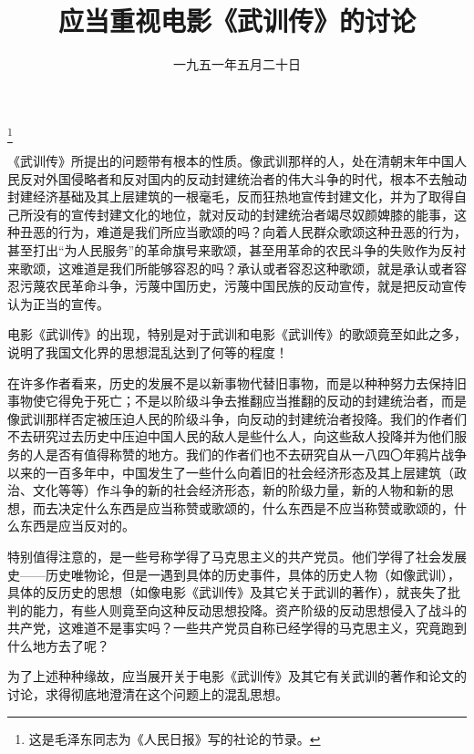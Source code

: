 
\title{应当重视电影《武训传》的讨论}
\date{一九五一年五月二十日}
\thanks{这是毛泽东同志为《人民日报》写的社论的节录。}
\maketitle


《武训传》所提出的问题带有根本的性质。像武训那样的人，处在清朝末年中国人民反对外国侵略者和反对国内的反动封建统治者的伟大斗争的时代，根本不去触动封建经济基础及其上层建筑的一根毫毛，反而狂热地宣传封建文化，并为了取得自己所没有的宣传封建文化的地位，就对反动的封建统治者竭尽奴颜婢膝的能事，这种丑恶的行为，难道是我们所应当歌颂的吗？向着人民群众歌颂这种丑恶的行为，甚至打出“为人民服务”的革命旗号来歌颂，甚至用革命的农民斗争的失败作为反衬来歌颂，这难道是我们所能够容忍的吗？承认或者容忍这种歌颂，就是承认或者容忍污蔑农民革命斗争，污蔑中国历史，污蔑中国民族的反动宣传，就是把反动宣传认为正当的宣传。

电影《武训传》的出现，特别是对于武训和电影《武训传》的歌颂竟至如此之多，说明了我国文化界的思想混乱达到了何等的程度！

在许多作者看来，历史的发展不是以新事物代替旧事物，而是以种种努力去保持旧事物使它得免于死亡；不是以阶级斗争去推翻应当推翻的反动的封建统治者，而是像武训那样否定被压迫人民的阶级斗争，向反动的封建统治者投降。我们的作者们不去研究过去历史中压迫中国人民的敌人是些什么人，向这些敌人投降并为他们服务的人是否有值得称赞的地方。我们的作者们也不去研究自从一八四〇年鸦片战争以来的一百多年中，中国发生了一些什么向着旧的社会经济形态及其上层建筑（政治、文化等等）作斗争的新的社会经济形态，新的阶级力量，新的人物和新的思想，而去决定什么东西是应当称赞或歌颂的，什么东西是不应当称赞或歌颂的，什么东西是应当反对的。

特别值得注意的，是一些号称学得了马克思主义的共产党员。他们学得了社会发展史——历史唯物论，但是一遇到具体的历史事件，具体的历史人物（如像武训），具体的反历史的思想（如像电影《武训传》及其它关于武训的著作），就丧失了批判的能力，有些人则竟至向这种反动思想投降。资产阶级的反动思想侵入了战斗的共产党，这难道不是事实吗？一些共产党员自称已经学得的马克思主义，究竟跑到什么地方去了呢？

为了上述种种缘故，应当展开关于电影《武训传》及其它有关武训的著作和论文的讨论，求得彻底地澄清在这个问题上的混乱思想。
